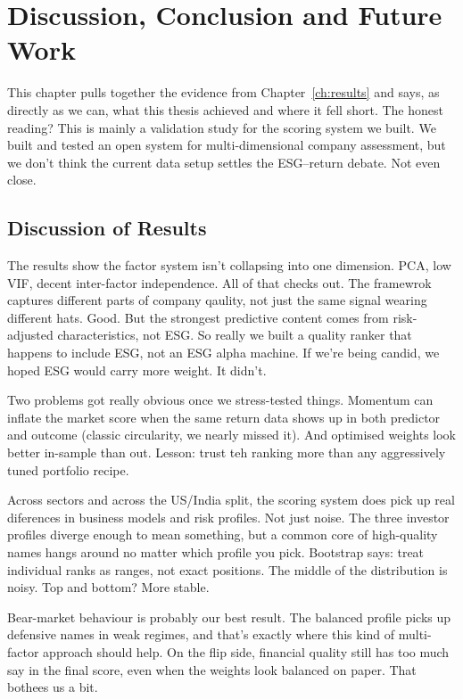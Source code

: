 \chapter{Discussion, Conclusion and Future Work}
\label{ch:conclusion}

This chapter pulls together the evidence from Chapter~\ref{ch:results}
and says, as directly as we can, what this thesis achieved and where it fell short.
The honest reading? This is mainly a validation study for the scoring system we built.
We built and tested an open system for multi-dimensional company assessment,
but we don't think the current data setup settles the ESG--return debate. Not even close.

\section{Discussion of Results}
\label{sec:discussion}

The results show the factor system isn't collapsing into one dimension. PCA, low VIF, decent inter-factor independence. All of that checks out. The framewrok captures different parts of company qaulity, not just the same signal wearing different hats. Good. But the strongest predictive content comes from risk-adjusted characteristics, not ESG. So really we built a quality ranker that happens to include ESG, not an ESG alpha machine. If we're being candid, we hoped ESG would carry more weight. It didn't.

Two problems got really obvious once we stress-tested things. Momentum can inflate the market score when the same return data shows up in both predictor and outcome (classic circularity, we nearly missed it). And optimised weights look better in-sample than out. Lesson: trust teh ranking more than any aggressively tuned portfolio recipe.

Across sectors and across the US/India split, the scoring system does pick up real diferences in business models and risk profiles. Not just noise. The three investor profiles diverge enough to mean something, but a common core of high-quality names hangs around no matter which profile you pick. Bootstrap says: treat individual ranks as ranges, not exact positions. The middle of the distribution is noisy. Top and bottom? More stable.

Bear-market behaviour is probably our best result. The balanced profile picks up defensive names in weak regimes, and that's exactly where this kind of multi-factor approach should help. On the flip side, financial quality still has too much say in the final score, even when the weights look balanced on paper. That bothees us a bit.

